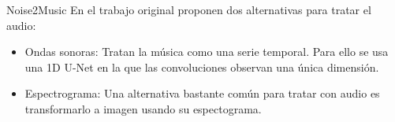 \begin{frame}{Noise2Music}
En el trabajo original proponen dos alternativas para tratar el audio:
\begin{itemize}
    \item \alert{Ondas sonoras}: Tratan la música como una serie temporal. Para ello se usa 
    una \alert{1D U-Net} en la que las convoluciones observan una única dimensión.
    
    \item \alert{Espectrograma}: Una alternativa bastante común para tratar con audio es transformarlo a imagen usando su \alert{espectograma}.
\end{itemize}
\end{frame}


